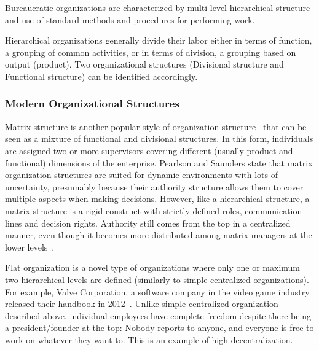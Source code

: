 Bureaucratic organizations \cite{minzberg81} are characterized by multi-level hierarchical structure and use of standard methods and procedures for performing work. 

Hierarchical organizations generally divide their labor either in terms of function, a grouping of common activities, or in terms of division, a grouping based on output (product). Two  organizational structures (Divisional structure and Functional structure) can be identified accordingly.

\subsubsection{Modern Organizational Structures}

Matrix structure is another popular style of organization structure~\cite{pearlson2009} that can be seen as a mixture of functional and divisional structures. In this form, individuals are assigned two or more supervisors covering different (usually product and functional) dimensions of the enterprise. Pearlson and Saunders state that matrix organization structures are suited for dynamic environments with lots of uncertainty, presumably because their authority structure allows them to cover multiple aspects when making decisions. However, like a hierarchical structure, a matrix structure is a rigid construct with strictly defined roles, communication lines and decision rights. Authority still comes from the top in a centralized manner, even though it becomes more distributed among matrix managers at the lower levels~\cite{pearlson2009}. 


Flat organization is a novel type of organizations where only one or maximum two hierarchical levels are defined (similarly to simple centralized organizations). For example, Valve Corporation, a software company in the video game industry released their handbook in 2012~\cite{valveHandbook}.  Unlike simple centralized organization described above, individual employees have complete freedom despite there being a president/founder at the top: Nobody reports to anyone, and everyone is free to work on whatever they want to. This is an example of high decentralization.

